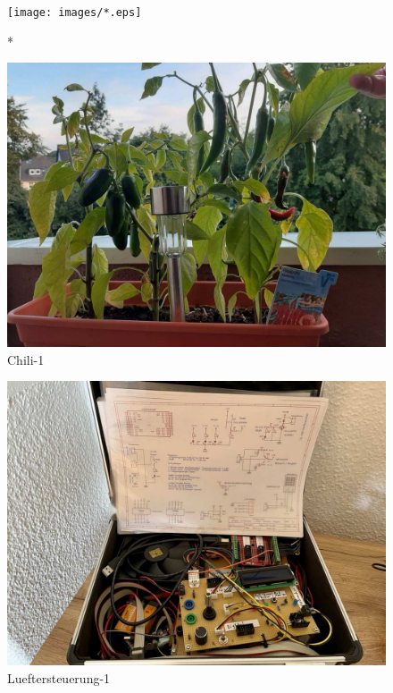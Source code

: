 %
%
%
\begin{figure}[!hb]%
    \centering
  \texttt{[image: images/*.eps]}%
  \caption{*}%
\end{figure}

%
%
\begin{figure}[!hb]%
    \centering
  \includegraphics[width=.80\textwidth]{images/Chili-1.pdf}%
  \caption{Chili-1}%
\end{figure}

%
%
\begin{figure}[!hb]%
    \centering
  \includegraphics[width=.80\textwidth]{images/Lueftersteuerung-1.pdf}%
  \caption{Lueftersteuerung-1}%
\end{figure}

